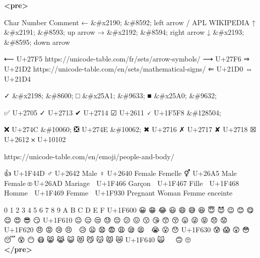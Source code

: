 \documentclass[
  a4paper,
]{book}
\newenvironment{Shaded}{}{}
\newcommand{\DecValTok}[1]{\textcolor[rgb]{0.25,0.63,0.44}{#1}}
\newcommand{\KeywordTok}[1]{\textcolor[rgb]{0.00,0.44,0.13}{\textbf{#1}}}
\newcommand{\NormalTok}[1]{#1}
\begin{document}
\begin{Shaded}
\begin{Highlighting}[]
\KeywordTok{\textless{}pre\textgreater{}}

\NormalTok{    Char Number Comment}
\NormalTok{    ← }\DecValTok{\&\#x2190;} \DecValTok{\&\#8592;}\NormalTok{ left arrow / APL WIKIPEDIA}
\NormalTok{    ↑ }\DecValTok{\&\#x2191;} \DecValTok{\&\#8593;}\NormalTok{ up arrow}
\NormalTok{    → }\DecValTok{\&\#x2192;} \DecValTok{\&\#8594;}\NormalTok{ right arrow}
\NormalTok{    ↓ }\DecValTok{\&\#x2193;} \DecValTok{\&\#8595;}\NormalTok{ down arrow}

\NormalTok{    ⟵ U+27F5 https://unicode{-}table.com/fr/sets/arrow{-}symbols/}
\NormalTok{    ⟶ U+27F6}
\NormalTok{    ⇒ U+21D2 https://unicode{-}table.com/en/sets/mathematical{-}signs/}
\NormalTok{    ⇐ U+21D0}
\NormalTok{    ⇔ U+21D4}

\NormalTok{    ✓ }\DecValTok{\&\#x2198;} \DecValTok{\&\#8600;}
\NormalTok{    □ }\DecValTok{\&\#x25A1;} \DecValTok{\&\#9633;}
\NormalTok{    ■ }\DecValTok{\&\#x25A0;} \DecValTok{\&\#9632;}

\NormalTok{    ✅ U+2705}
\NormalTok{    ✓ U+2713}
\NormalTok{    ✔ U+2714}
\NormalTok{    ☑ U+2611}
\NormalTok{    🗸 U+1F5F8 }\DecValTok{\&\#128504;}


\NormalTok{    ❌ U+274C }\DecValTok{\&\#10060;}
\NormalTok{    ❎ U+274E }\DecValTok{\&\#10062;}
\NormalTok{    ✖ U+2716}
\NormalTok{    ✗ U+2717}
\NormalTok{    ✘ U+2718}
\NormalTok{    ☒ U+2612}
\NormalTok{    𐄂 U+10102}


\NormalTok{    https://unicode{-}table.com/en/emoji/people{-}and{-}body/}

\NormalTok{    👍 U+1F44D}
\NormalTok{    ♂ U+2642 Male}
\NormalTok{    ♀ U+2640 Female Femelle}
\NormalTok{    ⚥ U+26A5 Male Female}
\NormalTok{    ⚭ U+26AD Mariage}
\NormalTok{    👦 U+1F466 Garçon}
\NormalTok{    👧 U+1F467 Fille}
\NormalTok{    👨 U+1F468 Homme}
\NormalTok{    👩 U+1F469 Femme}
\NormalTok{    🤰 U+1F930 Pregnant Woman Femme enceinte}

\NormalTok{    0 1 2 3 4 5 6 7 8 9 A B C D E F}
\NormalTok{    U+1F600 😀 😁 😂 😃 😄 😅 😆 😇 😈 😉 😊 😋 😌 😍 😎 😏}
\NormalTok{    U+1F610 😐 😑 😒 😓 😔 😕 😖 😗 😘 😙 😚 😛 😜 😝 😞 😟}
\NormalTok{    U+1F620 😠 😡 😢 😣 😤 😥 😦 😧 😨 😩 😪 😫 😬 😭 😮 😯}
\NormalTok{    U+1F630 😰 😱 😲 😳 😴 😵 😶 😷 😸 😹 😺 😻 😼 😽 😾 😿}
\NormalTok{    U+1F640 🙀 🙁 🙂 🙃 🙄 🙅 🙆 🙇 🙈 🙉 🙊 🙋 🙌 🙍 🙎 🙏}
\KeywordTok{\textless{}/pre\textgreater{}}
\end{Highlighting}
\end{Shaded}
\end{document}

